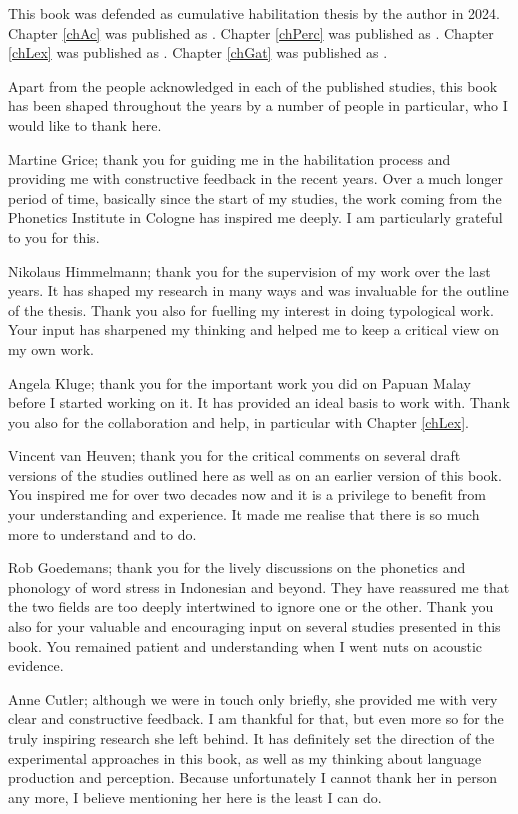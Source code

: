 \addchap{\lsAcknowledgementTitle} 

This book was defended as cumulative habilitation thesis by the author in 2024. Chapter \ref{chAc} was published as \citet{kaland_acoustic_2019}. Chapter \ref{chPerc} was published as \citet{kaland_offline_2020}. Chapter \ref{chLex} was published as \citet{kaland_lexical_2021}. Chapter \ref{chGat} was published as \citet{kaland_perception_2021}.

Apart from the people acknowledged in each of the published studies, this book has been shaped throughout the years by a number of people in particular, who I would like to thank here.

Martine Grice; thank you for guiding me in the habilitation process and providing me with constructive feedback in the recent years. Over a much longer period of time, basically since the start of my studies, the work coming from the Phonetics Institute in Cologne has inspired me deeply. I am particularly grateful to you for this.

Nikolaus Himmelmann; thank you for the supervision of my work over the last years. It has shaped my research in many ways and was invaluable for the outline of the thesis. Thank you also for fuelling my interest in doing typological work. Your input has sharpened my thinking and helped me to keep a critical view on my own work.

Angela Kluge; thank you for the important work you did on Papuan Malay before I started working on it. It has provided an ideal basis to work with. Thank you also for the collaboration and help, in particular with Chapter \ref{chLex}.

Vincent van Heuven; thank you for the critical comments on several draft versions of the studies outlined here as well as on an earlier version of this book. You inspired me for over two decades now and it is a privilege to benefit from your understanding and experience. It made me realise that there is so much more to understand and to do.

Rob Goedemans; thank you for the lively discussions on the phonetics and phonology of word stress in Indonesian and beyond. They have reassured me that the two fields are too deeply intertwined to ignore one or the other. Thank you also for your valuable and encouraging input on several studies presented in this book. You remained patient and understanding when I went nuts on acoustic evidence.

Anne Cutler; although we were in touch only briefly, she provided me with very clear and constructive feedback. I am thankful for that, but even more so for the truly inspiring research she left behind. It has definitely set the direction of the experimental approaches in this book, as well as my thinking about language production and perception. Because unfortunately I cannot thank her in person any more, I believe mentioning her here is the least I can do.

